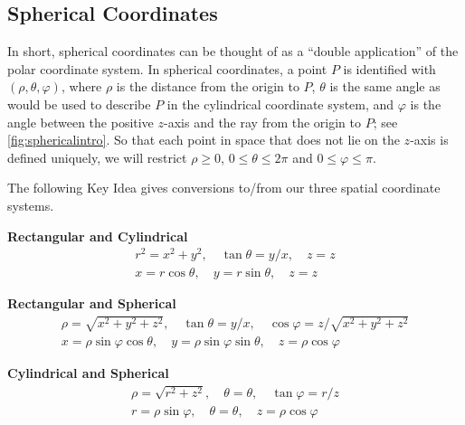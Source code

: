 \subsection{Spherical Coordinates}

In short, spherical coordinates can be thought of as a ``double application'' of the polar coordinate system. In spherical coordinates, a point $P$ is identified with $(\rho,\theta,\varphi)$, where $\rho$ is the distance from the origin to $P$, $\theta$ is the same angle as would be used to describe $P$ in the cylindrical coordinate system, and $\varphi$ is the angle between the positive $z$-axis and the ray from the origin to $P$; see \autoref{fig:sphericalintro}. So that each point in space that does not lie on the $z$-axis is defined uniquely, we will restrict $\rho \geq 0$, $0 \leq \theta \leq 2\pi$ and $0 \leq \varphi \leq \pi$.
%
%

The following Key Idea gives conversions to/from our three spatial coordinate systems.

{\textbf{Rectangular and Cylindrical}
$$\begin{array}{c}
r^2 = x^2+y^2,\quad \tan \theta = y/x,\quad z=z\\
x=r\cos \theta, \quad y=r\sin\theta,\quad z=z
\end{array}$$

\textbf{Rectangular and Spherical}
\[
\begin{array}{c}
\rho = \sqrt{x^2+y^2+z^2},\quad \tan \theta = y/x,\quad \cos \varphi = z/\sqrt{x^2+y^2+z^2}\\
x=\rho\sin\varphi\cos\theta,\quad y=\rho\sin\varphi\sin\theta,\quad z=\rho\cos\varphi
\end{array}
\]

\textbf{Cylindrical and Spherical }
\[
\begin{array}{c}
\rho=\sqrt{r^2+z^2}, \quad \theta = \theta,\quad \tan \varphi = r/z \\
r=\rho \sin \varphi, \quad \theta = \theta, \quad z=\rho\cos\varphi
\end{array}
\]}

